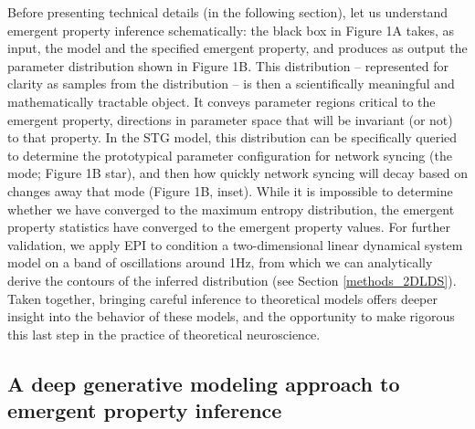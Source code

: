 \documentclass[11pt]{article}
\begin{document}
Before presenting technical details (in the following section), let us understand emergent property inference schematically:  the black box in Figure 1A takes, as input, the model and the specified emergent property, and produces as output the parameter distribution shown in Figure 1B.  
This distribution -- represented for clarity as samples from the distribution -- is then a scientifically meaningful and mathematically tractable object.  
It conveys parameter regions critical to the emergent property, directions in parameter space that will be invariant (or not) to that property.  
In the STG model, this distribution can be specifically queried to determine the prototypical parameter configuration for network syncing (the mode; Figure 1B star), and then how quickly network syncing will decay based on changes away that mode (Figure 1B, inset).  
While it is impossible to determine whether we have converged to the maximum entropy distribution, the emergent property statistics have converged to the emergent property values.  
For further validation, we apply EPI to condition a two-dimensional linear dynamical system model on a band of oscillations around 1Hz, from which we can analytically derive the contours of the inferred distribution (see Section \ref{methods_2DLDS}).
Taken together, bringing careful inference to theoretical models offers deeper insight into the behavior of these models, and the opportunity to make rigorous this last step in the practice of theoretical neuroscience.

\subsection{A deep generative modeling approach to emergent property inference} \label{results_dgm}
\end{document}

